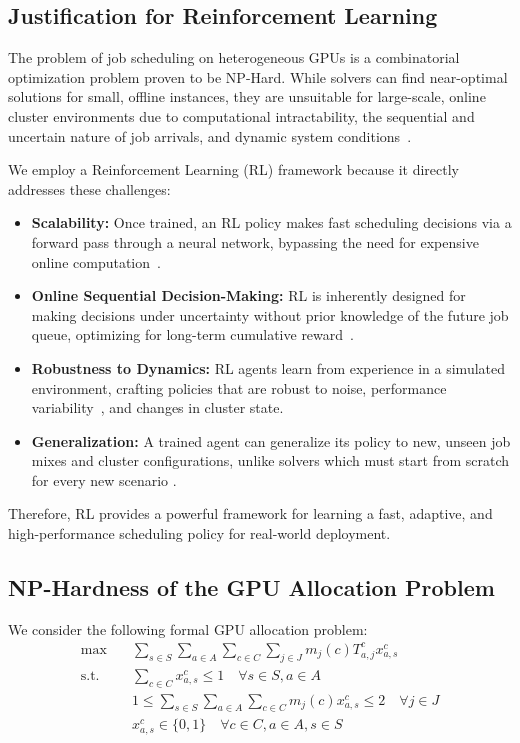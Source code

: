 \documentclass{article}
\begin{document}
\subsection{Justification for Reinforcement Learning}
\label{sec:justification}

The problem of job scheduling on heterogeneous GPUs is a combinatorial optimization problem proven to be NP-Hard. While solvers can find near-optimal solutions for small, offline instances, they are unsuitable for large-scale, online cluster environments due to computational intractability, the sequential and uncertain nature of job arrivals, and dynamic system conditions~\cite{mao2019learning, weng2022mlaas}.

We employ a Reinforcement Learning (RL) framework because it directly addresses these challenges:
\begin{itemize}
   \item \textbf{Scalability:} Once trained, an RL policy makes fast scheduling decisions via a forward pass through a neural network, bypassing the need for expensive online computation~\cite{mao2019learning}.
    \item \textbf{Online Sequential Decision-Making:} RL is inherently designed for making decisions under uncertainty without prior knowledge of the future job queue, optimizing for long-term cumulative reward~\cite{sutton2018reinforcement}.
    \item \textbf{Robustness to Dynamics:} RL agents learn from experience in a simulated environment, crafting policies that are robust to noise, performance variability~\cite{wang2018perturbed}, and changes in cluster state.
    \item \textbf{Generalization:} A trained agent can generalize its policy to new, unseen job mixes and cluster configurations, unlike solvers which must start from scratch for every new scenario \cite{mao2018decima}.
\end{itemize}
Therefore, RL provides a powerful framework for learning a fast, adaptive, and high-performance scheduling policy for real-world deployment.

\subsection{NP-Hardness of the GPU Allocation Problem}

We consider the following formal GPU allocation problem:
\begin{align}
    \max \quad & \sum_{s \in S} \sum_{a \in A} \sum_{c \in C} \sum_{j \in J} m_j(c) T^c_{a,j} x^c_{a,s} \\
    \text{s.t.} \quad & \sum_{c \in C} x^c_{a,s} \leq 1 \quad \forall s \in S, a \in A \\
    & 1 \leq \sum_{s \in S} \sum_{a \in A} \sum_{c \in C} m_j(c) x^c_{a,s} \leq 2 \quad \forall j \in J \\
    & x^c_{a,s} \in \{0,1\} \quad \forall c \in C, a \in A, s \in S
\end{align}
\end{document}
